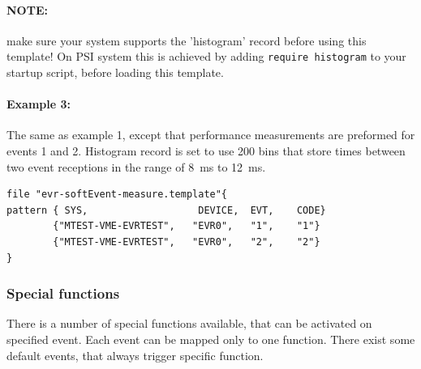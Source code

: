 \documentclass[12pt,a4paper]{article}
\begin{document}
 
\paragraph{NOTE:} make sure your system supports the 'histogram' record before using this template! On PSI system this is achieved by adding \texttt{require histogram} to your startup script, before loading this template.

\paragraph{Example 3:} The same as example 1, except that performance measurements are preformed for events 1 and 2. Histogram record is set to use 200 bins that store times between two event receptions in the range of 8~ms to 12~ms.
\begin{verbatim}
file "evr-softEvent-measure.template"{
pattern { SYS,                   DEVICE,  EVT,    CODE}
        {"MTEST-VME-EVRTEST",   "EVR0",   "1",    "1"}
        {"MTEST-VME-EVRTEST",   "EVR0",   "2",    "2"}
}
\end{verbatim}

\subsubsection{Special functions}\label{sec:Special functions}
There is a number of special functions available, that can be activated
on specified event. Each event can be mapped only to one function. There
exist some default events, that always trigger specific function.
\end{document}
